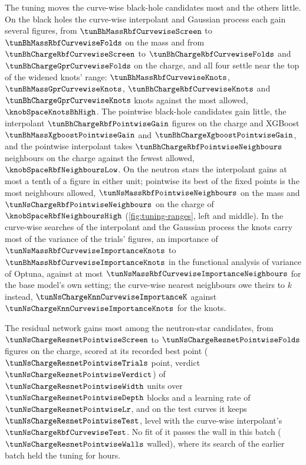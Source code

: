 The tuning moves the curve-wise black-hole candidates most and the others little. On the black holes the curve-wise interpolant and Gaussian process each gain several figures, from $\tunBhMassRbfCurvewiseScreen$ to $\tunBhMassRbfCurvewiseFolds$ on the mass and from $\tunBhChargeRbfCurvewiseScreen$ to $\tunBhChargeRbfCurvewiseFolds$ and $\tunBhChargeGprCurvewiseFolds$ on the charge, and all four settle near the top of the widened knots' range: $\tunBhMassRbfCurvewiseKnots$, $\tunBhMassGprCurvewiseKnots$, $\tunBhChargeRbfCurvewiseKnots$ and $\tunBhChargeGprCurvewiseKnots$ knots against the most allowed, $\knobSpaceKnotsBhHigh$. The pointwise black-hole candidates gain little, the interpolant $\tunBhChargeRbfPointwiseGain$ figures on the charge and XGBoost $\tunBhMassXgboostPointwiseGain$ and $\tunBhChargeXgboostPointwiseGain$, and the pointwise interpolant takes $\tunBhChargeRbfPointwiseNeighbours$ neighbours on the charge against the fewest allowed, $\knobSpaceRbfNeighboursLow$. On the neutron stars the interpolant gains at most a tenth of a figure in either unit; pointwise its best of the fixed points is the most neighbours allowed, $\tunNsMassRbfPointwiseNeighbours$ on the mass and $\tunNsChargeRbfPointwiseNeighbours$ on the charge of $\knobSpaceRbfNeighboursHigh$ (\cref{fig:tuning-ranges}, left and middle). In the curve-wise searches of the interpolant and the Gaussian process the knots carry most of the variance of the trials' figures, an importance of $\tunNsMassRbfCurvewiseImportanceKnots$ to $\tunBhMassRbfCurvewiseImportanceKnots$ in the functional analysis of variance of Optuna, against at most $\tunNsMassRbfCurvewiseImportanceNeighbours$ for the base model's own setting; the curve-wise nearest neighbours owe theirs to $k$ instead, $\tunNsChargeKnnCurvewiseImportanceK$ against $\tunNsChargeKnnCurvewiseImportanceKnots$ for the knots.

The residual network gains most among the neutron-star candidates, from $\tunNsChargeResnetPointwiseScreen$ to $\tunNsChargeResnetPointwiseFolds$ figures on the charge, scored at its recorded best point ($\tunNsChargeResnetPointwiseTrials$ point, verdict $\tunNsChargeResnetPointwiseVerdict$) of $\tunNsChargeResnetPointwiseWidth$ units over $\tunNsChargeResnetPointwiseDepth$ blocks and a learning rate of $\tunNsChargeResnetPointwiseLr$, and on the test curves it keeps $\tunNsChargeResnetPointwiseTest$, level with the curve-wise interpolant's $\tunNsChargeRbfCurvewiseTest$. No fit of it passes the wall in this batch ($\tunNsChargeResnetPointwiseWalls$ walled), where its search of the earlier batch held the tuning for hours.

